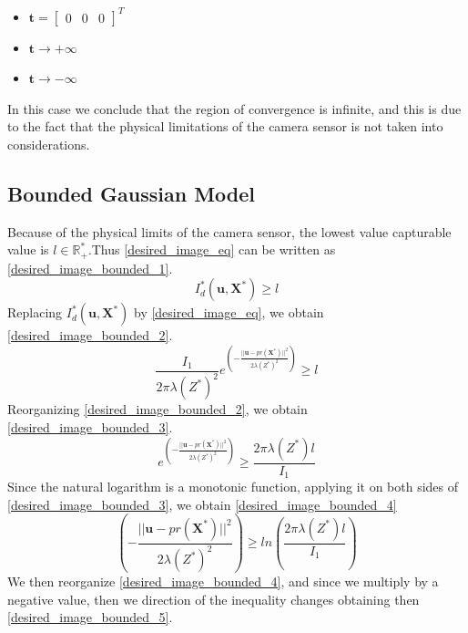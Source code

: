 \begin{itemize}
    \item $\textbf{t} = \begin{bmatrix}
        0 & 0 & 0
    \end{bmatrix}^{T}$ 
    \item $\textbf{t} \rightarrow +\infty$
    \item $\textbf{t} \rightarrow -\infty$
\end{itemize}
In this case we conclude that the region of convergence is infinite, and this is due to the fact that the physical limitations of the camera sensor is not taken into considerations. 
\subsection{Bounded Gaussian Model }
Because of the physical limits of the camera sensor, the lowest value capturable value is $\textit{l}\in \mathbb{R}^{*}_{+}$.Thus \eqref{desired_image_eq} can be written as \eqref{desired_image_bounded_1}. 
\begin{equation}
    I_{d}^{*}(\textbf{u}, \textbf{X}^{*})\geq l
    \label{desired_image_bounded_1}
\end{equation}
Replacing $I^{*}_{d}(\textbf{u}, \textbf{X}^{*})$ by \eqref{desired_image_eq}, we obtain \eqref{desired_image_bounded_2}.
\begin{equation}
    \frac{I_{1}}{2\pi\lambda(Z^{*})^{2}} e^{\left(-\frac{||\textbf{u}-pr(\textbf{X}^{*})||^{2}}{2\lambda(Z^{*})^{2}}\right)} \geq l
    \label{desired_image_bounded_2}
\end{equation}
Reorganizing \eqref{desired_image_bounded_2}, we obtain \eqref{desired_image_bounded_3}.
\begin{equation}
    e^{\left(-\frac{||\textbf{u}-pr(\textbf{X}^{*})||^{2}}{2\lambda(Z^{*})^{2}}\right)} \geq \frac{2\pi\lambda(Z^{*})l}{I_{1}}
    \label{desired_image_bounded_3}
\end{equation}
Since the natural logarithm is a monotonic function, applying it on both sides of \eqref{desired_image_bounded_3}, we obtain \eqref{desired_image_bounded_4}
\begin{equation}
    \left(-\frac{||\textbf{u}-pr(\textbf{X}^{*})||^{2}}{2\lambda(Z^{*})^{2}}\right) \geq ln\left(\frac{2\pi\lambda(Z^{*})l}{I_{1}}\right)
    \label{desired_image_bounded_4}
\end{equation}
We then reorganize \eqref{desired_image_bounded_4}, and since we multiply by a negative value, then we direction of the inequality changes obtaining then \eqref{desired_image_bounded_5}.
